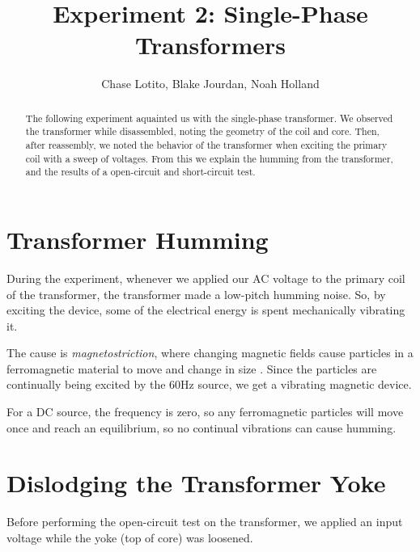 \documentclass{IEEEtran}
\title{Experiment 2: Single-Phase Transformers}
\author{Chase Lotito, Blake Jourdan, Noah Holland}
\date{}
\begin{document}
\pagestyle{fancy}

\fancyhf{}

\maketitle

\begin{abstract}
    The following experiment aquainted us with the single-phase transformer. We observed the transformer while disassembled, noting the geometry of the coil and core. Then, after reassembly, we noted the behavior of the transformer when exciting the primary coil with a sweep of voltages. From this we explain the humming from the transformer, and the results of a open-circuit and short-circuit test.
\end{abstract}

\section{Transformer Humming}

During the experiment, whenever we applied our AC voltage to the primary coil of the transformer, the transformer made a low-pitch humming noise. So, by exciting the device, some of the electrical energy is spent mechanically vibrating it.

The cause is \emph{magnetostriction}, where changing magnetic fields cause particles in a ferromagnetic material to move and change in size \cite{magnetostriction}. Since the particles are continually being excited by the 60Hz source, we get a vibrating magnetic device.

For a DC source, the frequency is zero, so any ferromagnetic particles will move once and reach an equilibrium, so no continual vibrations can cause humming.

\section{Dislodging the Transformer Yoke}

Before performing the open-circuit test on the transformer, we applied an input voltage while the yoke (top of core) was loosened.


\end{document}
